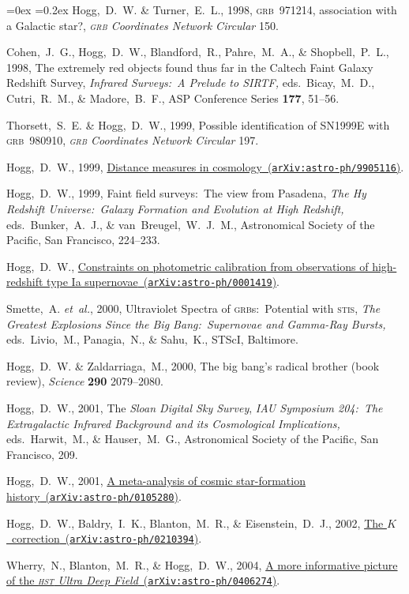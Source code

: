 \documentclass[12pt,letterpaper]{article}
\newcommand{\latin}[1]{\textsl{#1}}
\newcommand{\etal}{\latin{et~al.}}
\newcommand{\project}[1]{\textsl{#1}}
\newcommand{\arxiv}[2]{\href{http://arxiv.org/abs/#1}{{#2}\ (\texttt{arXiv:#1})}}
\newcounter{refpubnum}
\newcommand{\hogglist}{%
    \rightmargin=0in
    \leftmargin=0.18in
    \topsep=0ex
    \partopsep=0pt
    \itemsep=0.2ex
    \parsep=0pt
    \itemindent=-1.0\leftmargin
    \listparindent=0.0\leftmargin
    \settowidth{\labelsep}{~}
    \usecounter{refpubnum}
  }
\begin{document}
\begin{list}{}{\hogglist}
Hogg,~D.~W. \& Turner,~E.~L., 1998,
{\textsc{grb}~971214, association with a Galactic star?},
\textit{\textsc{grb} Coordinates Network Circular} 150.
\item
Cohen,~J.~G., Hogg,~D.~W., Blandford,~R., Pahre,~M.~A., \& Shopbell,~P.~L., 1998,
{The extremely red objects found thus far in the Caltech Faint Galaxy Redshift Survey},
\textit{Infrared Surveys:\ A Prelude to SIRTF,} eds.\ Bicay,~M.~D., Cutri,~R.~M., \& Madore,~B.~F.,
ASP Conference Series \textbf{177}, 51--56.
\item
Thorsett,~S.~E. \& Hogg,~D.~W., 1999,
{Possible identification of SN1999E with \textsc{grb}~980910},
\textit{\textsc{grb} Coordinates Network Circular} 197.
\item
Hogg,~D.~W., 1999,
\arxiv{astro-ph/9905116}{Distance measures in cosmology}.
\item
Hogg,~D.~W., 1999,
{Faint field surveys:\ The view from Pasadena},
\textit{The Hy Redshift Universe:\ Galaxy Formation and Evolution at
High Redshift,} eds.\ Bunker,~A.~J., \& van~Breugel,~W.~J.~M.,
Astronomical Society of the Pacific, San Francisco, 224--233.
\item
Hogg,~D.~W.,
\arxiv{astro-ph/0001419}{Constraints on photometric calibration from observations of high-redshift type Ia supernovae}.
\item
Smette,~A. \etal, 2000,
{Ultraviolet Spectra of \textsc{grb}s:\ Potential with
\textsc{stis}},
\textit{The Greatest Explosions Since the Big Bang:\ Supernovae
and Gamma-Ray Bursts,} eds.\ Livio,~M., Panagia,~N., \& Sahu,~K.,
STScI, Baltimore.
\item
Hogg,~D.~W. \& Zaldarriaga,~M., 2000,
{The big bang's radical brother
(book review)},
\textit{Science} \textbf{290} 2079--2080.
\item
Hogg,~D.~W., 2001,
{The \project{Sloan Digital Sky Survey}},
\textit{IAU Symposium 204:\ The Extragalactic Infrared Background and
its Cosmological Implications,} eds.\ Harwit,~M., \& Hauser,~M.~G.,
Astronomical Society of the Pacific, San Francisco, 209.
\item
Hogg,~D.~W., 2001,
\arxiv{astro-ph/0105280}{A meta-analysis of cosmic star-formation history}.
\item
Hogg,~D.~W., Baldry,~I.~K., Blanton,~M.~R., \& Eisenstein,~D.~J., 2002,
\arxiv{astro-ph/0210394}{The $K$~correction}.
\item
Wherry,~N., Blanton,~M.~R., \& Hogg,~D.~W., 2004,
\arxiv{astro-ph/0406274}{A more informative picture of the \project{\textsc{hst} Ultra Deep Field}}.
\item

\end{list}
\end{document}
